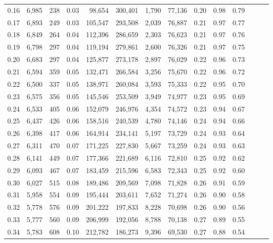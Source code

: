 \begin{tabular}{rrrrrrrrrrrrrr}
0.16 &  6,985 &    238 &  0.03 &   98,654 &  300,401 &   1,790 &  77,136 &  0.20 &  0.98 &      0.79 \\
0.17 &  6,893 &    249 &  0.03 &  105,547 &  293,508 &   2,039 &  76,887 &  0.21 &  0.97 &      0.77 \\
0.18 &  6,849 &    264 &  0.04 &  112,396 &  286,659 &   2,303 &  76,623 &  0.21 &  0.97 &      0.76 \\
0.19 &  6,798 &    297 &  0.04 &  119,194 &  279,861 &   2,600 &  76,326 &  0.21 &  0.97 &      0.75 \\
0.20 &  6,683 &    297 &  0.04 &  125,877 &  273,178 &   2,897 &  76,029 &  0.22 &  0.96 &      0.73 \\
0.21 &  6,594 &    359 &  0.05 &  132,471 &  266,584 &   3,256 &  75,670 &  0.22 &  0.96 &      0.72 \\
0.22 &  6,500 &    337 &  0.05 &  138,971 &  260,084 &   3,593 &  75,333 &  0.22 &  0.95 &      0.70 \\
0.23 &  6,575 &    356 &  0.05 &  145,546 &  253,509 &   3,949 &  74,977 &  0.23 &  0.95 &      0.69 \\
0.24 &  6,533 &    405 &  0.06 &  152,079 &  246,976 &   4,354 &  74,572 &  0.23 &  0.94 &      0.67 \\
0.25 &  6,437 &    426 &  0.06 &  158,516 &  240,539 &   4,780 &  74,146 &  0.24 &  0.94 &      0.66 \\
0.26 &  6,398 &    417 &  0.06 &  164,914 &  234,141 &   5,197 &  73,729 &  0.24 &  0.93 &      0.64 \\
0.27 &  6,311 &    470 &  0.07 &  171,225 &  227,830 &   5,667 &  73,259 &  0.24 &  0.93 &      0.63 \\
0.28 &  6,141 &    449 &  0.07 &  177,366 &  221,689 &   6,116 &  72,810 &  0.25 &  0.92 &      0.62 \\
0.29 &  6,093 &    467 &  0.07 &  183,459 &  215,596 &   6,583 &  72,343 &  0.25 &  0.92 &      0.60 \\
0.30 &  6,027 &    515 &  0.08 &  189,486 &  209,569 &   7,098 &  71,828 &  0.26 &  0.91 &      0.59 \\
0.31 &  5,958 &    554 &  0.09 &  195,444 &  203,611 &   7,652 &  71,274 &  0.26 &  0.90 &      0.58 \\
0.32 &  5,778 &    576 &  0.09 &  201,222 &  197,833 &   8,228 &  70,698 &  0.26 &  0.90 &      0.56 \\
0.33 &  5,777 &    560 &  0.09 &  206,999 &  192,056 &   8,788 &  70,138 &  0.27 &  0.89 &      0.55 \\
0.34 &  5,783 &    608 &  0.10 &  212,782 &  186,273 &   9,396 &  69,530 &  0.27 &  0.88 &      0.54 \\

\end{tabular}
